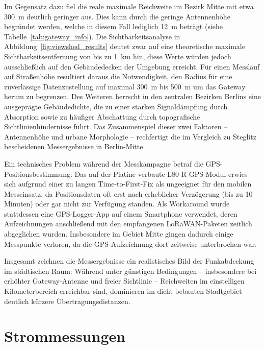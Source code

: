 Im Gegensatz dazu fiel die reale maximale Reichweite im Bezirk Mitte mit etwa \SI{300}{\meter} deutlich geringer aus. Dies kann durch die geringe Antennenhöhe 
begründet werden, welche in diesem Fall lediglich \SI{12}{\meter} beträgt (siehe Tabelle~\ref{tab:gateway_info}). 
Die Sichtbarkeitsanalyse in Abbildung~\ref{fig:viewshed_results} deutet zwar auf eine theoretische maximale Sichtbarkeitsentfernung 
von bis zu \SI{1}{\kilo\meter} hin, diese Werte würden jedoch ausschließlich auf den Gebäudedecken der Umgebung erreicht. 
Für einen Messlauf auf Straßenhöhe resultiert daraus die Notwendigkeit, den Radius für eine zuverlässige Datenzustellung auf maximal 
\SI{300}{\meter} bis \SI{500}{\meter} um das Gateway herum zu begrenzen. Des Weiteren herrscht in den zentralen Bezirken 
Berlins eine ausgeprägte Gebäudedichte, die zu einer starken Signaldämpfung durch Absorption sowie zu häufiger Abschattung
durch topografische Sichtlinienhindernisse führt. Das Zusammenspiel dieser zwei Faktoren – Antennenhöhe und urbane Morphologie – 
rechfertigt die im Vergleich zu Steglitz bescheidenen Messergebnisse in Berlin-Mitte.

Ein technisches Problem während der Messkampagne betraf die GPS-Positionsbestimmung: Das auf der Platine verbaute L80-R-GPS-Modul 
erwies sich aufgrund einer zu langen Time-to-First-Fix als ungeeignet für den mobilen Messeinsatz, da Positionsdaten 
oft erst nach erheblicher Verzögerung (bis zu 10 Minuten) oder gar nicht zur Verfügung standen. Als Workaround wurde stattdessen eine 
GPS-Logger-App auf einem Smartphone verwendet, deren Aufzeichnungen anschließend mit den empfangenen LoRaWAN-Paketen 
zeitlich abgeglichen wurden. Insbesondere im Gebiet Mitte gingen dadurch einige Messpunkte verloren, da die GPS-Aufzeichnung 
dort zeitweise unterbrochen war.

Insgesamt zeichnen die Messergebnisse ein realistisches Bild der Funkabdeckung im städtischen Raum: Während unter günstigen 
Bedingungen -- insbesondere bei erhöhter Gateway-Antenne und freier Sichtlinie -- Reichweiten im einstelligen Kilometerbereich erreichbar sind, 
dominieren im dicht bebauten Stadtgebiet deutlich kürzere Übertragungsdistanzen.

\section{Strommessungen} 


